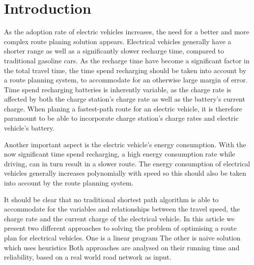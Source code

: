 \section{Introduction}

As the adoption rate of electric vehicles increases, the need for a better and more complex route planing solution appears. Electrical vehicles generally have a shorter range as well as a significantly slower recharge time, compared to traditional gasoline cars. As the recharge time have become a significant factor in the total travel time, the time spend recharging should be taken into account by a route planning system, to accommodate for an otherwise large margin of error. Time spend recharging batteries is inherently variable, as the charge rate is affected by both the charge station's charge rate as well as the battery's current charge. When planing a fastest-path route for an electric vehicle, it is therefore paramount to be able to incorporate charge station's charge rates and electric vehicle's battery.

Another important aspect is the electric vehicle's energy consumption. With the now significant time spend recharging, a high energy consumption rate while driving, can in turn result in a slower route. The energy consumption of electrical vehicles generally increases polynomially with speed so this should also be taken into account by the route planning system.

It should be clear that no traditional shortest path algorithm is able to accommodate for the variables and relationships between the travel speed, the charge rate and the current charge of the electrical vehicle. In this article we present two different approaches to solving the problem of optimising a route plan for electrical vehicles. One is a linear program
 The other is naive solution which uses heuristics
 Both approaches are analysed on their running time and reliability, based on a real world road network as input.




